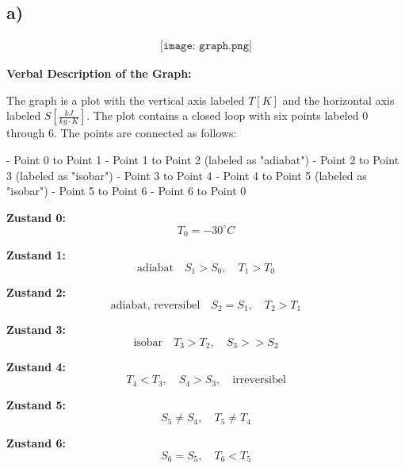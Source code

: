 

\subsection*{a)}

\[
\begin{array}{c}
\texttt{[image: graph.png]}
\end{array}
\]

\textbf{Verbal Description of the Graph:}

The graph is a plot with the vertical axis labeled \( T [K] \) and the horizontal axis labeled \( S \left[ \frac{kJ}{kg \cdot K} \right] \). The plot contains a closed loop with six points labeled 0 through 6. The points are connected as follows:

- Point 0 to Point 1
- Point 1 to Point 2 (labeled as "adiabat")
- Point 2 to Point 3 (labeled as "isobar")
- Point 3 to Point 4
- Point 4 to Point 5 (labeled as "isobar")
- Point 5 to Point 6
- Point 6 to Point 0

\textbf{Zustand 0:}
\[
T_0 = -30^\circ C
\]

\textbf{Zustand 1:}
\[
\text{adiabat} \quad S_1 > S_0, \quad T_1 > T_0
\]

\textbf{Zustand 2:}
\[
\text{adiabat, reversibel} \quad S_2 = S_1, \quad T_2 > T_1
\]

\textbf{Zustand 3:}
\[
\text{isobar} \quad T_3 > T_2, \quad S_3 >> S_2
\]

\textbf{Zustand 4:}
\[
T_4 < T_3, \quad S_4 > S_3, \quad \text{irreversibel}
\]

\textbf{Zustand 5:}
\[
S_5 \neq S_4, \quad T_5 \neq T_4
\]

\textbf{Zustand 6:}
\[
S_6 = S_5, \quad T_6 < T_5
\]